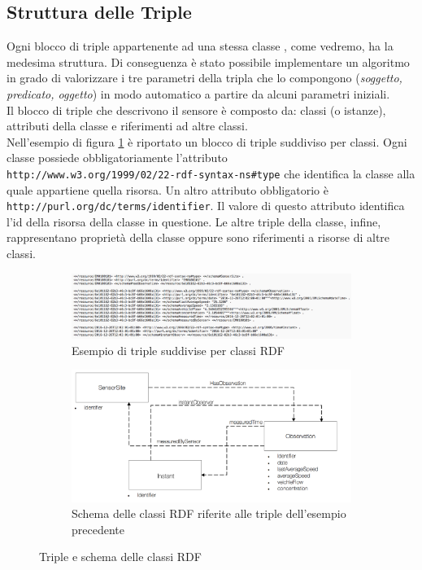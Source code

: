 \documentclass[12pt,a4paper,italian]{article}
\begin{document}
\subsection{Struttura delle Triple}
Ogni blocco di triple appartenente ad una stessa classe , come vedremo, ha la medesima struttura. Di conseguenza è stato possibile implementare un algoritmo in grado di valorizzare
i tre parametri della tripla che lo compongono (\emph{soggetto, predicato, oggetto}) in modo automatico a partire da alcuni parametri iniziali.\\
Il blocco di triple che descrivono il sensore è composto da: classi (o istanze), attributi della classe e riferimenti ad altre classi.\\
Nell'esempio di figura \ref{triplerdf} è riportato un blocco di triple suddiviso per classi. Ogni classe possiede obbligatoriamente l'attributo\\ \texttt{http://www.w3.org/1999/02/22-rdf-syntax-ns\#type} che identifica la classe alla quale appartiene quella risorsa.
Un altro attributo obbligatorio è \texttt{http://purl.org/dc/terms/identifier}. Il valore di questo attributo identifica l'id della risorsa della classe in questione.
Le altre triple della classe, infine, rappresentano proprietà della classe oppure sono riferimenti a risorse di altre classi.\\
\begin{figure}[!h]
	\begin{subfigure}{1\textwidth}
		\centering
		\includegraphics[width=14cm]{img/triple.png}
		\caption{Esempio di triple suddivise per classi RDF}\label{triplerdf}
	\end{subfigure}
	\begin{subfigure}{1\textwidth}
		\centering
		\includegraphics[width=14cm]{img/schema.png}
		\caption{Schema delle classi RDF riferite alle triple dell'esempio precedente}\label{schema}
	\end{subfigure}
	\caption{Triple e schema delle classi RDF}\label{rdfcombo}
\end{figure}
\end{document}
